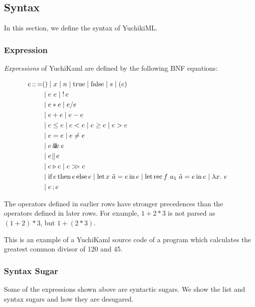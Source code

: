 
\subsection{Syntax}
In this section, we define the syntax of YuchikiML.

\subsubsection{Expression}

\emph{Expressions} of YuchiKaml are defined by the following BNF equations:

\begin{align*}
    e \defeq    & () \mid x \mid n \mid \trueToken \mid \falseToken \mid s \mid (e)\\
                &\mid e\ e \mid \logNot e\\
                &\mid e * e \mid e / e\\
                &\mid e + e \mid e - e\\
                &\mid e \leq e \mid e < e \mid e \geq e \mid e > e\\
                &\mid e = e \mid e \not= e\\
                &\mid e \logAnd e\\
                &\mid e \logOr e\\
                &\mid e \triangleright e \mid e \composition e\\
                &\mid \ifStructure{e}{e}{e} \mid \letStructure{x\ \tilde{a}}{e}{e} \mid \letRecStructure{f}{a_1\ \tilde{a}}{e}{e} \mid \abs{x}{e}\\
                &\mid e\opCol{}e
\end{align*}

The operators defined in earlier rows have stronger precedences than the operators defined in later rows.
For example, $1 + 2 * 3$ is not parsed as $(1 + 2) * 3$, but $1 + ( 2 * 3)$.

\begin{example}[GCD]
    This is an example of a YuchiKaml source code of a program which calculates the greatest common divisor of 120 and 45.

    
\end{example}

\subsubsection{Syntax Sugar}
Some of the expressions shown above are syntactic sugars.
We show the list and syntax sugars and how they are desugared.

